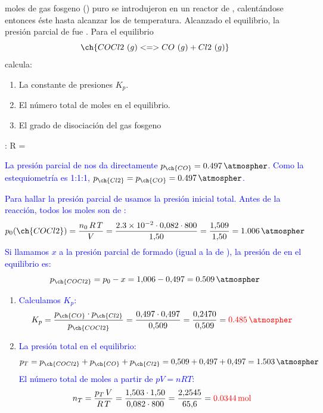 \begin{exerciseEVAU}
     moles de gas fosgeno () puro se introdujeron en un reactor de , calentándose entonces éste hasta alcanzar los  de temperatura. Alcanzado el equilibrio, la presión parcial de  fue . Para el equilibrio
    \begin{equation*}
        \ch{COCl2\ (g) <=> CO\ (g) + Cl2\ (g)}
    \end{equation*}
    calcula:
    \begin{enumerate}[label=\letraminuscula]
        \item La constante de presiones \(K_p\).
        \item El número total de moles en el equilibrio.
        \item El grado de disociación del gas fosgeno
    \end{enumerate}
    \datos{}: R = \ctegases

    \begin{solu}

    \textcolor{blue}{La presión parcial de  nos da directamente \(p_{\ch{CO}} = \qty{0{,}497}{\atmospher}\). Como la estequiometría es 1:1:1, \(p_{\ch{Cl2}} = p_{\ch{CO}} = \qty{0{,}497}{\atmospher}\).}

    \textcolor{blue}{Para hallar la presión parcial de  usamos la presión inicial total. Antes de la reacción, todos los moles son de :}
    \[
        p_0(\ch{COCl2}) = \frac{n_0\,R\,T}{V} = \frac{\num{2{,}3e-2}\cdot0{,}082\cdot800}{1{,}50} = \frac{1{,}509}{1{,}50} = \qty{1{,}006}{\atmospher}
    \]
    \textcolor{blue}{Si llamamos \(x\) a la presión parcial de  formado (igual a la de ), la presión de  en el equilibrio es:}
    \[
        p_{\ch{COCl2}} = p_0 - x = 1{,}006 - 0{,}497 = \qty{0{,}509}{\atmospher}
    \]

    \begin{enumerate}[label=\letraminuscula]
        \item \textcolor{blue}{Calculamos \(K_p\):}
        \[
            K_p = \frac{p_{\ch{CO}}\cdot p_{\ch{Cl2}}}{p_{\ch{COCl2}}} = \frac{0{,}497\cdot0{,}497}{0{,}509} = \frac{0{,}2470}{0{,}509} = \textcolor{red}{\qty{0{,}485}{\atmospher}}
        \]

        \item \textcolor{blue}{La presión total en el equilibrio:}
        \[
            p_T = p_{\ch{COCl2}} + p_{\ch{CO}} + p_{\ch{Cl2}} = 0{,}509 + 0{,}497 + 0{,}497 = \qty{1{,}503}{\atmospher}
        \]
        \textcolor{blue}{El número total de moles a partir de \(pV = nRT\):}
        \[
            n_T = \frac{p_T\,V}{R\,T} = \frac{1{,}503\cdot1{,}50}{0{,}082\cdot800} = \frac{2{,}2545}{65{,}6} = \textcolor{red}{\qty{0{,}0344}{\mol}}
        \]


\end{enumerate}
\end{solu}
\end{exerciseEVAU}
